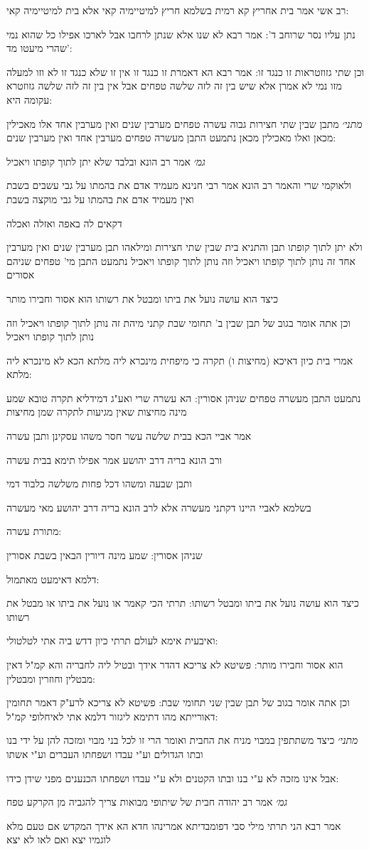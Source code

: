 \documentclass[12pt, openany]{book}
\newcommand{\sethebfont}{
\fontsize{10.5pt}{21.0pt} \selectfont
}
\newcommand{\textblock}[1]{
{\sethebfont #1\\}	
}
\begin{document}
\textblock{רב אשי אמר בית אחריץ קא רמית בשלמא חריץ למיטיימיה קאי אלא בית למיטיימיה קאי:}
\textblock{נתן עליו נסר שרוחב ד': אמר רבא לא שנו אלא שנתן לרחבו אבל לארכו אפילו כל שהוא נמי שהרי מיעטו מד':}
\textblock{וכן שתי גזוזטראות זו כנגד זו: אמר רבא הא דאמרת זו כנגד זו אין זו שלא כנגד זו לא וזו למעלה מזו נמי לא אמרן אלא שיש בין זה לזה שלשה טפחים אבל אין בין זה לזה שלשה גזוזטרא עקומה היא:}
\textblock{{\large\emph{מתני׳}} מתבן שבין שתי חצירות גבוה עשרה טפחים מערבין שנים ואין מערבין אחד אלו מאכילין מכאן ואלו מאכילין מכאן נתמעט התבן מעשרה טפחים מערבין אחד ואין מערבין שנים:}
\textblock{{\large\emph{גמ׳}} אמר רב הונא ובלבד שלא יתן לתוך קופתו ויאכיל}
\textblock{ולאוקמי שרי והאמר רב הונא אמר רבי חנינא מעמיד אדם את בהמתו על גבי עשבים בשבת ואין מעמיד אדם את בהמתו על גבי מוקצה בשבת}
\textblock{דקאים לה באפה ואזלה ואכלה}
\textblock{ולא יתן לתוך קופתו תבן והתניא בית שבין שתי חצירות ומילאהו תבן מערבין שנים ואין מערבין אחד זה נותן לתוך קופתו ויאכיל וזה נותן לתוך קופתו ויאכיל נתמעט התבן מי' טפחים שניהם אסורים}
\textblock{כיצד הוא עושה נועל את ביתו ומבטל את רשותו הוא אסור וחבירו מותר}
\textblock{וכן אתה אומר בגוב של תבן שבין ב' תחומי שבת קתני מיהת זה נותן לתוך קופתו ויאכיל וזה נותן לתוך קופתו ויאכיל}
\textblock{אמרי בית כיון דאיכא (מחיצות ו) תקרה כי מיפחית מינכרא ליה מלתא הכא לא מינכרא ליה מלתא:}
\textblock{נתמעט התבן מעשרה טפחים שניהן אסורין: הא עשרה שרי ואע"ג דמידליא תקרה טובא שמע מינה מחיצות שאין מגיעות לתקרה שמן מחיצות}
\textblock{אמר אביי הכא בבית שלשה עשר חסר משהו עסקינן ותבן עשרה}
\textblock{ורב הונא בריה דרב יהושע אמר אפילו תימא בבית עשרה}
\textblock{ותבן שבעה ומשהו דכל פחות משלשה כלבוד דמי}
\textblock{בשלמא לאביי היינו דקתני מעשרה אלא לרב הונא בריה דרב יהושע מאי מעשרה}
\textblock{מתורת עשרה:}
\textblock{שניהן אסורין: שמע מינה דיורין הבאין בשבת אסורין}
\textblock{דלמא דאימעט מאתמול:}
\textblock{כיצד הוא עושה נועל את ביתו ומבטל רשותו: תרתי הכי קאמר או נועל את ביתו או מבטל את רשותו}
\textblock{ואיבעית אימא לעולם תרתי כיון דדש ביה אתי לטלטולי:}
\textblock{הוא אסור וחבירו מותר: פשיטא לא צריכא דהדר אידך ובטיל ליה לחבריה והא קמ"ל דאין מבטלין וחוזרין ומבטלין:}
\textblock{וכן אתה אומר בגוב של תבן שבין שני תחומי שבת: פשיטא לא צריכא לרע"ק דאמר תחומין דאורייתא מהו דתימא ליגזור דלמא אתי לאיחלופי קמ"ל:}
\textblock{{\large\emph{מתני׳}} כיצד משתתפין במבוי מניח את החבית ואומר הרי זו לכל בני מבוי ומזכה להן על ידי בנו ובתו הגדולים וע"י עבדו ושפחתו העברים וע"י אשתו}
\textblock{אבל אינו מזכה לא ע"י בנו ובתו הקטנים ולא ע"י עבדו ושפחתו הכנענים מפני שידן כידו:}
\textblock{{\large\emph{גמ׳}} אמר רב יהודה חבית של שיתופי מבואות צריך להגביה מן הקרקע טפח}
\textblock{אמר רבא הני תרתי מילי סבי דפומבדיתא אמרינהו חדא הא אידך המקדש אם טעם מלא לוגמיו יצא ואם לאו לא יצא}
\end{document}
